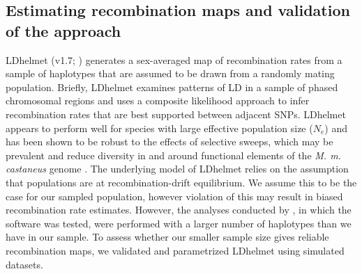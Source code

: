 \subsection{Estimating recombination maps and validation of the approach}
 
        	LDhelmet (v1.7; \citealt{RN213}) generates a sex-averaged map of recombination rates from a sample of haplotypes that are assumed to be drawn from a randomly mating population. Briefly, LDhelmet examines patterns of LD in a sample of phased chromosomal regions and uses a composite likelihood approach to infer recombination rates that are best supported between adjacent SNPs. LDhelmet appears to perform well for species with large effective population size ($N_e$) and has been shown to be robust to the effects of selective sweeps, which may be prevalent and reduce diversity in and around functional elements of the \emph{M. m. castaneus} genome \citep{RN122}. The underlying model of LDhelmet relies on the assumption that populations are at recombination-drift equilibrium. We assume this to be the case for our sampled population, however violation of this may result in biased recombination rate estimates. However, the analyses conducted by \cite{RN213}, in which the software was tested, were performed with a larger number of haplotypes than we have in our sample. To assess whether our smaller sample size gives reliable recombination maps, we validated and parametrized LDhelmet using simulated datasets.
 
